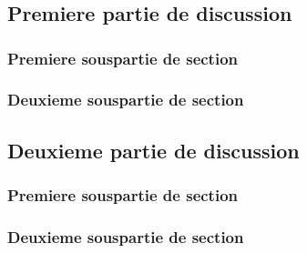 \chapter*{} \label{chapitre6-discussion} %
\setcounter{section}{0} %
\renewcommand*{\theHsection}{chY.\the\value{section}}
\pagestyle{discussion}

\section[Premiere partie]{Premiere partie de discussion}

\subsection{Premiere souspartie de section}

\newpage

\subsection{Deuxieme souspartie de section}

\newpage

\section[Deuxieme partie]{Deuxieme partie de discussion}

\subsection{Premiere souspartie de section}

\newpage

\subsection{Deuxieme souspartie de section}

\newpage